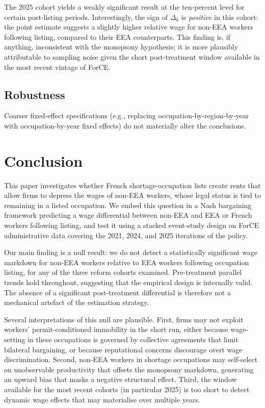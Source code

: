 \documentclass[9pt]{article}
\begin{document}
The 2025 cohort yields a weakly significant result at the ten-percent
level for certain post-listing periods. Interestingly, the sign of
$\Delta_k$ is \emph{positive} in this cohort: the point estimate suggests
a slightly higher relative wage for non-EEA workers following listing,
compared to their EEA counterparts. This finding is, if anything,
inconsistent with the monopsony hypothesis; it is more plausibly
attributable to sampling noise given the short post-treatment window
available in the most recent vintage of ForCE.

\subsection{Robustness}

Coarser fixed-effect specifications (e.g., replacing occupation-by-region-by-year
with occupation-by-year fixed effects) do not materially alter the conclusions.

\section{Conclusion}
\label{sec:conclusion}

This paper investigates whether French shortage-occupation lists create
rents that allow firms to depress the wages of non-EEA workers,
whose legal status is tied to remaining in a listed occupation. We embed
this question in a Nash bargaining framework predicting a wage differential
between non-EEA and EEA or French workers following listing, and test it
using a stacked event-study design on ForCE administrative data covering
the 2021, 2024, and 2025 iterations of the policy.

Our main finding is a null result: we do not detect a statistically
significant wage markdown for non-EEA workers relative to EEA workers
following occupation listing, for any of the three reform cohorts
examined. Pre-treatment parallel trends hold throughout, suggesting that
the empirical design is internally valid. The absence of a significant
post-treatment differential is therefore not a mechanical artefact of
the estimation strategy.

Several interpretations of this null are plausible. First, firms may
not exploit workers' permit-conditioned immobility in the short run,
either because wage-setting in these occupations is governed by
collective agreements that limit bilateral bargaining, or because
reputational concerns discourage overt wage discrimination. Second,
non-EEA workers in shortage occupations may self-select on unobservable
productivity that offsets the monopsony markdown, generating an upward
bias that masks a negative structural effect. Third, the window available
for the most recent cohorts (in particular 2025) is too short to
detect dynamic wage effects that may materialise over multiple years.
\end{document}
